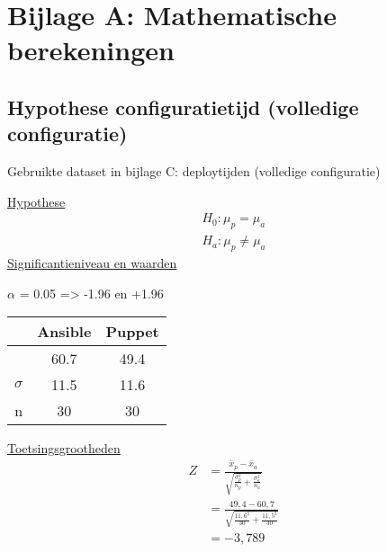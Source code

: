 
\chapter*{Bijlage A: Mathematische berekeningen}
\label{ch:mathematiek}

\section*{Hypothese configuratietijd (volledige configuratie)}
\label{wis:hypothesedeploytijd}

Gebruikte dataset in bijlage C: deploytijden (volledige configuratie)%

\underline{Hypothese}
\begin{align*}
H_0:  \mu_p = \mu_a \\
H_a: \mu_p\neq \mu_a 
\end{align*}
\underline{Significantieniveau en waarden}

$\alpha$ = 0.05 => -1.96 en +1.96 \newline

		\begin{tabular}{ r |c |c }
			& Ansible & Puppet\\\hline
			\unexpanded{$ \bar x  $} &  60.7 & 49.4\\ \hline
			$\sigma$ & 11.5 & 11.6\\ \hline
			n &  30 &  30

\end{tabular}


\underline{Toetsingsgrootheden}
\begin{equation} \label{eq1}
\begin{split}
Z &= \tfrac{\bar x_p - \bar x_a}{\sqrt{\tfrac{\sigma_p^2}{n_p}+\tfrac{\sigma_a^2}{n_a}}}\\
& = \tfrac{49,4 - 60,7}{\sqrt{\tfrac{11,6^2}{30}+\tfrac{11,5^2}{30}}} \\
& = -3,789
\end{split}
\end{equation}

